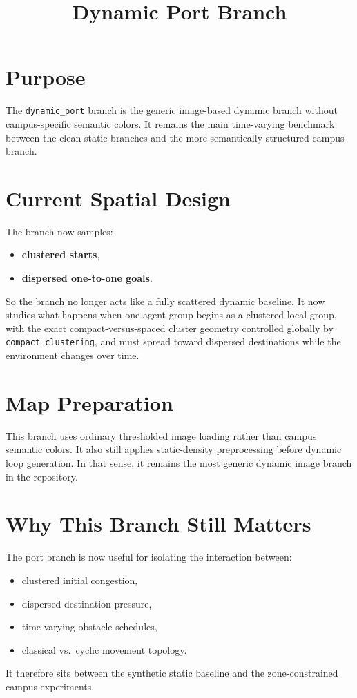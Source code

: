 \documentclass[11pt]{article}
\title{Dynamic Port Branch}
\author{}
\date{}
\begin{document}
\maketitle

\section{Purpose}

The \texttt{dynamic\_port} branch is the generic image-based dynamic branch without campus-specific semantic colors. It remains the main time-varying benchmark between the clean static branches and the more semantically structured campus branch.

\section{Current Spatial Design}

The branch now samples:
\begin{itemize}[leftmargin=2em]
    \item \textbf{clustered starts},
    \item \textbf{dispersed one-to-one goals}.
\end{itemize}

So the branch no longer acts like a fully scattered dynamic baseline. It now studies what happens when one agent group begins as a clustered local group, with the exact compact-versus-spaced cluster geometry controlled globally by \texttt{compact\_clustering}, and must spread toward dispersed destinations while the environment changes over time.

\section{Map Preparation}

This branch uses ordinary thresholded image loading rather than campus semantic colors. It also still applies static-density preprocessing before dynamic loop generation. In that sense, it remains the most generic dynamic image branch in the repository.

\section{Why This Branch Still Matters}

The port branch is now useful for isolating the interaction between:
\begin{itemize}[leftmargin=2em]
    \item clustered initial congestion,
    \item dispersed destination pressure,
    \item time-varying obstacle schedules,
    \item classical vs.\ cyclic movement topology.
\end{itemize}

It therefore sits between the synthetic static baseline and the zone-constrained campus experiments.
\end{document}
